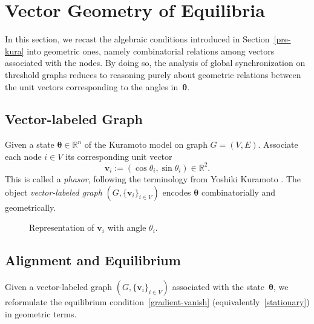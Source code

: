 \documentclass[11pt,reqno]{amsart}
\theoremstyle{definition}
\begin{document}
\section{Vector Geometry of Equilibria}\label{sec:geo-eq}
In this section, we recast the algebraic conditions introduced in Section~\ref{pre-kura} into geometric ones, namely combinatorial relations among vectors associated with the nodes. By doing so, the analysis of global synchronization on threshold graphs reduces to reasoning purely about geometric relations between the unit vectors corresponding to the angles in~$\boldsymbol{\theta}$.

\subsection{Vector-labeled Graph}
Given a state \( \boldsymbol{\theta} \in \mathbb{R}^n \) of the Kuramoto model on graph $G=(V,E)$. Associate each node \( i \in V \) its corresponding unit vector
\[
\boldsymbol{v}_i := (\cos \theta_i, \sin \theta_i) \in \mathbb{R}^2.
\]
This is called a \emph{phasor}, following the terminology from Yoshiki Kuramoto \cite{Kuramoto1975}.
The object \textit{vector-labeled graph} \( \left( G, \{ \boldsymbol{v}_i \}_{i \in V} \right) \) encodes \( \boldsymbol{\theta} \) combinatorially and geometrically.

\begin{figure}[H]
\centering
{}
\caption{Representation of $\boldsymbol{v}_i$ with angle $\theta_i$.}
\end{figure}

\subsection{Alignment and Equilibrium}\label{Alignment-and-equilibrium}
Given a vector-labeled graph $(G, \{\boldsymbol{v}_i\}_{i\in V})$ associated with the state~$\boldsymbol{\theta}$, 
we reformulate the equilibrium condition~\eqref{gradient-vanish} (equivalently~\eqref{stationary}) in geometric terms.
\end{document}
